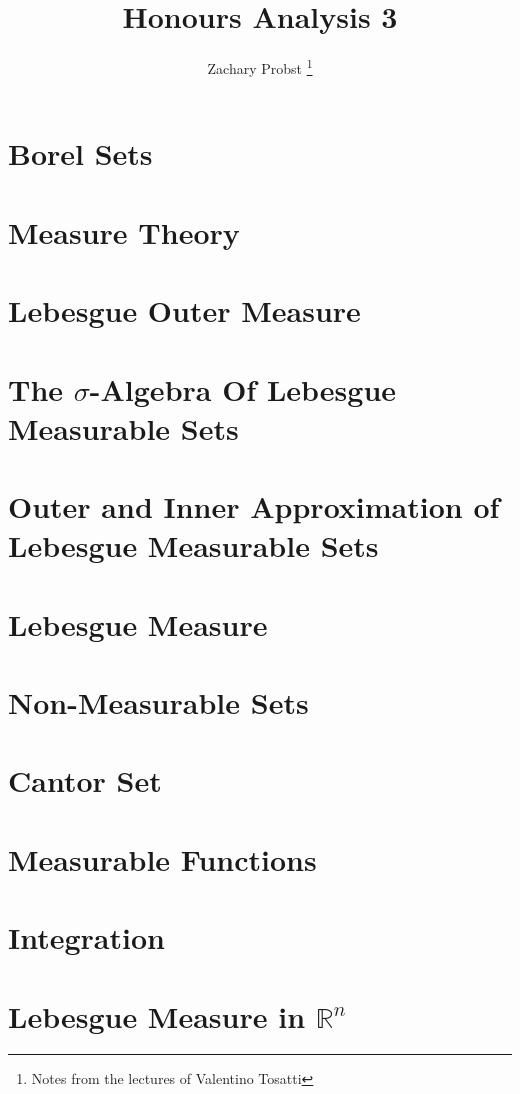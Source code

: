 \documentclass[11pt]{article}
\title{Honours Analysis 3}
\author{Zachary Probst \thanks{Notes from the lectures of Valentino Tosatti}}
\newcommand{\R}{\mathbb{R}}
\begin{document}
    \maketitle


    \section{Borel Sets}\label{sec:borel-sets}
    


    \section{Measure Theory}\label{sec:measure-theory}
    


    \section{Lebesgue Outer Measure}\label{sec:lebesgue-outer-measure}
    


    \section{The $\sigma$-Algebra Of Lebesgue Measurable Sets}\label{sec:the-$sigma$-algebra-of-lebesgue-measurable-sets}
    


    \section{Outer and Inner Approximation of Lebesgue Measurable Sets}\label{sec:outer-and-inner-approximation-of-lebesgue-measureable-sets}
    


    \section{Lebesgue Measure}\label{sec:lebesgue-measure}
    


    \section{Non-Measurable Sets}\label{sec:non-measurable-sets}
    


    \section{Cantor Set}\label{sec:cantor-set}
    


    \section{Measurable Functions}\label{sec:measurable-functions}
    


    \section{Integration}\label{sec:integration}
    

    \section{Lebesgue Measure in $\R^n$}\label{sec:lebesgue-measure-in-R^n}
    
\end{document}
